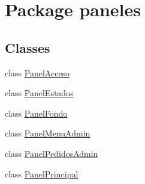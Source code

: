 \hypertarget{namespacepaneles}{}\section{Package paneles}
\label{namespacepaneles}
\subsection*{Classes}
\begin{DoxyCompactItemize}
\item 
class \mbox{\hyperlink{classpaneles_1_1_panel_acceso}{Panel\+Acceso}}
\item 
class \mbox{\hyperlink{classpaneles_1_1_panel_estados}{Panel\+Estados}}
\item 
class \mbox{\hyperlink{classpaneles_1_1_panel_fondo}{Panel\+Fondo}}
\item 
class \mbox{\hyperlink{classpaneles_1_1_panel_menu_admin}{Panel\+Menu\+Admin}}
\item 
class \mbox{\hyperlink{classpaneles_1_1_panel_pedidos_admin}{Panel\+Pedidos\+Admin}}
\item 
class \mbox{\hyperlink{classpaneles_1_1_panel_principal}{Panel\+Principal}}
\end{DoxyCompactItemize}
